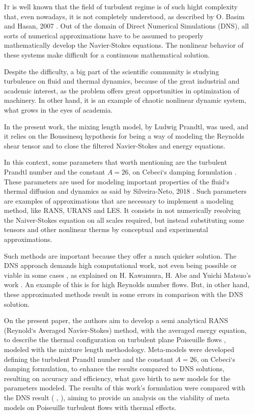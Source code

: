 \documentclass[10pt]{article} %
\begin{document}
\lettrine[nindent=0em,lines=2]{I}t is well known that the field of turbulent regime is of such hight complexity that, even nowadays, it is not completely understood, as described by O. Basim and Hasan, 2007 \cite{hasan}. Out of the domain of Direct Numerical Simulations (DNS), all sorts of numerical approximations have to be assumed to properly mathematically develop the Navier-Stokes equations. The nonlinear behavior of these systems \cite{John} make difficult for a continuous mathematical solution. 

Despite the difficulty, a big part of the scientific community is studying turbulence on fluid and thermal dynamics, because of the great industrial and academic interest, as the problem offers great opportunities in optimization of machinery. In other hand, it is an example of chaotic nonlinear dynamic system, what grows in the eyes of academia.   

In the present work, the mixing length model, by Ludwig Prandtl, was used, and it relies on the Boussinesq hypothesis for being a way of modeling the Reynolds shear tensor and to close the filtered Navier-Stokes and energy equations.

In this context, some parameters that worth mentioning are the turbulent Prandtl number \cite{Prandtl} and the constant $A = 26$, on Cebeci`s damping formulation \cite{Cebeci}. These parameters are used for modeling important properties of the fluid`s thermal diffusion and dynamics as said by Silveira-Neto, 2018 \cite{aristeu}. Such parameters are examples of approximations that are necessary to implement a modeling method, like RANS, URANS and LES. It consists in not numerically resolving the Naiver-Stokes equation on all scales required, but instead substituting some tensors and other nonlinear therms by conceptual and experimental approximations.

Such methods are important because they offer a much quicker solution. The DNS approach demands high computational work, not even being possible or viable in some cases \cite{Kawamura}, as explained on H. Kawamura, H. Abe and Yuichi Matsuo's work \cite{Abe}. An example of this is for high Reynolds number flows. But, in other hand, these approximated methods result in some errors in comparison with the DNS solution.    

On the present paper, the authors aim to develop a semi analytical RANS (Reynold`s Averaged Navier-Stokes) method, with the averaged energy equation, to describe the thermal configuration on turbulent plane Poiseuille flows \cite{Poiseuille}, modeled with the mixture length methodology. Meta-models were developed defining the turbulent Prandtl number and the constant $A = 26$, on Cebeci`s damping formulation, to enhance the results compared to DNS solutions, resulting on accuracy and efficiency, what gave birth to new models for the parameters modeled. The results of this work's formulation were compared with the DNS result (\cite{DNS1020} , \cite{DNS150}), aiming to provide an analysis on the viability of meta models on Poiseuille turbulent flows with thermal effects. \\       
 
\end{document}

